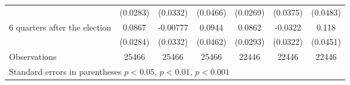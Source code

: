 \begin{table}[!ht]
\begin{tabular}{l*{6}{c}}
                    &    (0.0283)         &    (0.0332)         &    (0.0466)         &    (0.0269)         &    (0.0375)         &    (0.0483)         \\
[0.5em]
 6 quarters after the election&      0.0867\sym{**} &    -0.00777         &      0.0944\sym{*}  &      0.0862\sym{**} &     -0.0322         &       0.118\sym{**} \\
                    &    (0.0284)         &    (0.0332)         &    (0.0462)         &    (0.0293)         &    (0.0322)         &    (0.0451)         \\
\hline
Observations        &       25466         &       25466         &       25466         &       22446         &       22446         &       22446         \\
\hline\hline
\multicolumn{7}{l}{ Standard errors in parentheses \sym{*} \(p<0.05\), \sym{**} \(p<0.01\), \sym{***} \(p<0.001\)}\\
\end{tabular}
\end{table}
